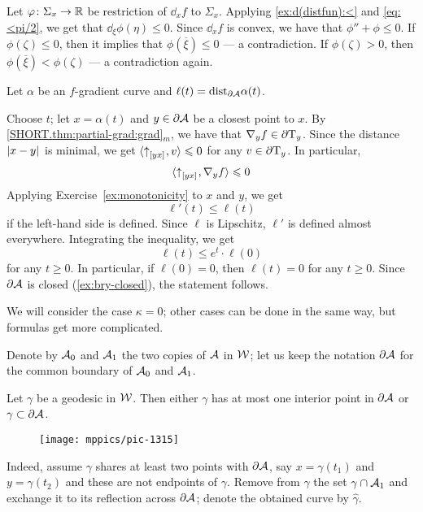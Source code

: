 Let $\varphi\colon\Sigma_x\to\mathbb{R}$ be restriction of $\dd_xf$ to $\Sigma_x$.
Applying \ref{ex:d(distfun):<} and \ref{eq:<pi/2}, we get that $\dd_\xi\phi(\eta)\le 0$.
Since $\dd_xf$ is convex, we have that $\phi''+\phi\le 0$.
If $\phi(\zeta)\le 0$, then it implies that $\phi(\overline{\xi})\le 0$ --- a contradiction.
If $\phi(\zeta)> 0$, then $\phi(\overline{\xi})<\phi(\zeta)$ --- a contradiction again.

Let $\alpha$ be an $f$-gradient curve and $\ell(t)=\mathrm{dist}_{\partial \mathcal{A}}\alpha(t)$.

Choose $t$;
let $x=\alpha(t)$ and $y\in \partial\mathcal{A}$ be a closest point to $x$.
By \ref{SHORT.thm:partial-grad:grad}$_m$, we have that $\nabla_y f\in\partial \mathrm{T}_y$.
Since the distance $|{x}-{y}|_{}^{{}}$ is minimal, 
we get $\langle {\uparrow}_{[{y}{x}]_{{}}},v\rangle\leqslant 0$ for any $v\in \partial \mathrm{T}_y$.
In particular,
\[\langle {\uparrow}_{[{y}{x}]_{{}}},\nabla_y f\rangle\leqslant 0\]
Applying Exercise~\ref{ex:monotonicity} to $x$ and $y$, 
we get
\[\ell'(t)\le \ell(t)\]
if the left-hand side is defined.
Since $\ell$ is Lipschitz, $\ell'$ is defined almost everywhere.
Integrating the inequality, we get 
\[\ell(t)\le e^t\cdot\ell(0)\]
for any $t\ge 0$.
In particular, if $\ell(0)=0$, then $\ell(t)=0$ for any $t\ge 0$.
Since $\partial\mathcal{A}$ is closed (\ref{ex:bry-closed}), the statement follows.

We will consider the case $\kappa=0$;
other cases can be done in the same way, but formulas get more complicated.

Denote by $\mathcal{A}_0$ and $\mathcal{A}_1$ the two copies of $\mathcal{A}$ in $\mathcal{W}$;
let us keep the notation $\partial \mathcal{A}$ for the common boundary of $\mathcal{A}_0$ and $\mathcal{A}_1$.

\begin{clm}{}
Let $\gamma$ be a geodesic in $\mathcal{W}$.
Then either $\gamma$ has at most one interior point in $\partial \mathcal{A}$ or
$\gamma\subset \partial \mathcal{A}$.
\end{clm}

\begin{wrapfigure}{r}{45mm}
\vskip-2mm
\centering
\texttt{[image: mppics/pic-1315]}
\end{wrapfigure}

Indeed, assume $\gamma$ shares at least two points with $\partial \mathcal{A}$, say $x=\gamma(t_1)$ and $y=\gamma(t_2)$ and these are not endpoints of $\gamma$.
Remove from $\gamma$ the set $\gamma\cap \mathcal{A}_1$
and exchange it to its reflection across $\partial\mathcal{A}$;
denote the obtained curve by $\hat\gamma$.

